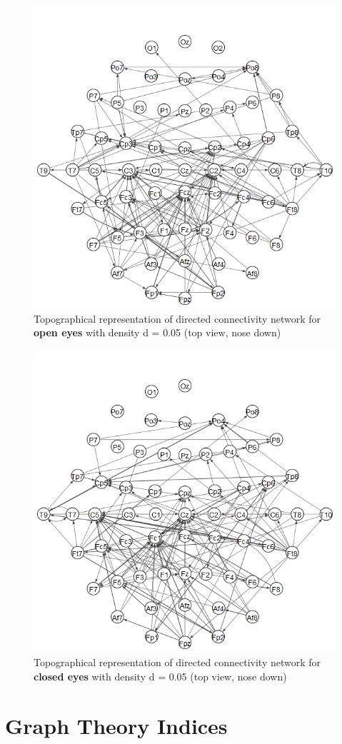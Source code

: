 \documentclass[%
 aip,
 jmp,%
 amsmath,amssymb,
 reprint,%
]{revtex4-1}
\begin{document}
\begin{figure}
	\includegraphics[width=0.7\linewidth]{../open_top_repr}
	\caption{Topographical representation of directed connectivity network for \textbf{open eyes} with density d = 0.05 (top view, nose down)}
	\label{fig:opentoprepr}
\end{figure}

\begin{figure}
	\centering
	\includegraphics[width=0.7\linewidth]{../closed_top_repr}
	\caption{Topographical representation of directed connectivity network for \textbf{closed eyes} with density d = 0.05 (top view, nose down)}
	\label{fig:closedtoprepr}
\end{figure}

\section{\label{sec:level1}Graph Theory Indices}
\end{document}
